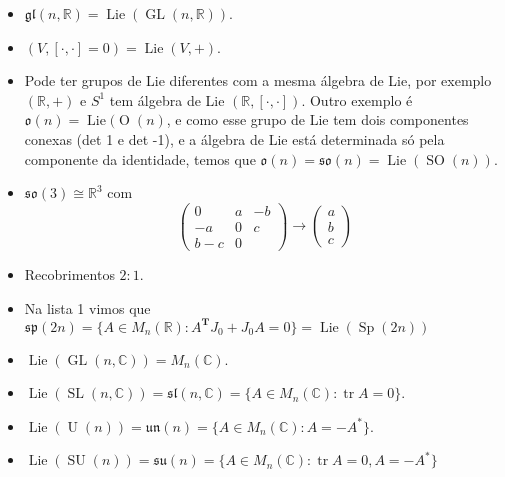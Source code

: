 \begin{example}\leavevmode 
	\begin{itemize}
	\item $\mathfrak{gl}(n,\mathbb{R}) =\operatorname{Lie}(\operatorname{GL}(n,\mathbb{R}))$.
	\item $(V,[\cdot,\cdot ]=0)=\operatorname{Lie}(V,+)$.

	\item Pode ter grupos de Lie diferentes com a mesma \'algebra de Lie, por exemplo $(\mathbb{R},+)$ e $S^1$ tem \'algebra de Lie $(\mathbb{R},[\cdot,\cdot ])$. Outro exemplo \'e $\mathfrak{o}(n)= \operatorname{Lie}(\operatorname{O}(n)$, e como esse grupo de Lie tem dois componentes conexas (det 1 e det -1), e a \'algebra de Lie est\'a determinada s\'o pela componente da identidade, temos que $\mathfrak{o}(n)=\mathfrak{so}(n)= \operatorname{Lie}(\operatorname{SO}(n))$.

	\item $\mathfrak{so}(3) \cong \mathbb{R}^{3}$ com
		\[\begin{pmatrix} 0&a &-b\\-a &0&c\\b-c &0 \end{pmatrix} \longrightarrow \begin{pmatrix} a \\b\\ c \end{pmatrix} \]

	\item Recobrimentos $2:1$.

	 \item Na lista 1 vimos que $\mathfrak{sp}(2n)= \{A\in M_n(\mathbb{R}):A^{\mathbf{T}}J_0+J_0A=0\} =\operatorname{Lie}(\operatorname{Sp}(2n) )$ 

	\item $\operatorname{Lie}(\operatorname{GL}(n,\mathbb{C})) =M_n(\mathbb{C})$.

	\item $\operatorname{Lie}(\operatorname{SL}(n,\mathbb{C})) =\mathfrak{sl}(n,\mathbb{C})=\{A\in M_n(\mathbb{C}):\operatorname{tr}A=0\}$.
	\item $\operatorname{Lie}(\operatorname{U}(n)) =\mathfrak{un}(n) =\{A\in M_n(\mathbb{C}):A=-A^*\}$.
	\item $\operatorname{Lie}(\operatorname{SU}(n)) =\mathfrak{su}(n) =\{A\in M_n(\mathbb{C}):\operatorname{tr}A=0,A=-A^*\}$
	\end{itemize}
\end{example}

